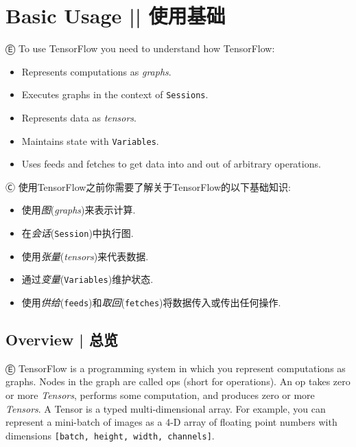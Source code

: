

\section{Basic Usage   ||   使用基础} \label{basic_usage}

Ⓔ \textcolor{etc}{To use TensorFlow you need to understand how TensorFlow:}

\begin{itemize}
\item \textcolor{etc}{Represents computations as \emph{graphs}.}
\item \textcolor{etc}{Executes graphs in the context of \lstinline{Sessions}.}
\item \textcolor{etc}{Represents data as \emph{tensors}.}
\item \textcolor{etc}{Maintains state with \lstinline{Variables}.}
\item \textcolor{etc}{Uses feeds and fetches to get data into and out of arbitrary operations.}
\end{itemize}

Ⓒ 使用TensorFlow之前你需要了解关于TensorFlow的以下基础知识:

\begin{itemize}
\item 使用\emph{图}(\emph{graphs})来表示计算.
\item 在\emph{会话}(\lstinline{Session})中执行图.
\item 使用\emph{张量}(\emph{tensors})来代表数据.
\item 通过\emph{变量}(\lstinline{Variables})维护状态.
\item 使用\emph{供给}(\lstinline{feeds})和\emph{取回}(\lstinline{fetches})将数据传入或传出任何操作.
\end{itemize}

%
\subsection{Overview  |  总览}

Ⓔ \textcolor{etc}{TensorFlow is a programming system in which you represent computations as graphs. Nodes in the graph are called ops (short for operations). An op takes zero or more \emph{Tensors}, performs some computation, and produces zero or more \emph{Tensors}. A Tensor is a typed multi-dimensional array. For example, you can represent a mini-batch of images as a 4-D array of floating point numbers with dimensions \lstinline{[batch, height, width, channels]}.}

